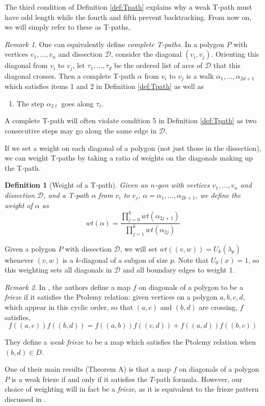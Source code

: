 \documentclass[12pt]{article}
\newtheorem{definition}{Definition}
\theoremstyle{remark}
\newtheorem{remark}{Remark}
\newcommand*{\D}{\mathcal{D}}
\begin{document}
The third condition of Definition \ref{def:Tpath} explains why a weak T-path must have odd length while the fourth and fifth prevent backtracking. From now on, we will simply refer to these as T-paths,

\begin{remark}\label{rem:completeTpath}
One can equivalently define \emph{complete T-paths}. In a polygon $P$ with vertices $v_1,\ldots,v_n$ and dissection $\D$, consider the diagonal $(v_i,v_j)$. Orienting this diagonal from $v_i$ to $v_j$, let $\tau_1,\ldots,\tau_d$ be the ordered list of arcs of $\D$ that this diagonal crosses. Then a complete T-path $\alpha$ from $v_i$ to $v_j$ is a walk $\alpha_1,\ldots,\alpha_{2d+1}$ which satisfies items 1 and 2 in Definition \ref{def:Tpath} as well as 
\begin{enumerate}
    \item[3'] The step $\alpha_{2\ell}$ goes along $\tau_\ell$.
\end{enumerate}

A complete T-path will often violate condition 5 in Definition \ref{def:Tpath} as two consecutive steps may go along the same edge in $\D$. 
\end{remark}

If we set a weight on each diagonal of a polygon (not just those in the dissection), we can weight T-paths by taking a ratio of weights on the diagonals making up the T-path. 

\begin{definition}[Weight of a T-path]
Given an $n$-gon with vertices $v_1,\ldots,v_n$ and dissection $\D$, and a T-path $\alpha$ from $v_i$ to $v_j$, $\alpha = \alpha_1,\ldots,\alpha_{2k+1}$, we define the weight of $\alpha$ as \[
wt(\alpha) = \frac{\displaystyle\prod_{j = 0}^k wt(\alpha_{2j+1})}{\displaystyle\prod_{j=1}^k wt(\alpha_{2j})}
\]
\end{definition}

Given a polygon $P$ with dissection $\D$, we will set $wt((v,w)) = U_k(\lambda_p)$ whenever $(v,w)$ is a $k$-diagonal of a subgon of size $p$. Note that $U_0(x) = 1$, so this weighting sets all diagonals in $\D$ and all boundary edges to weight 1. 

\begin{remark}
In \cite{8}, the authors define a map $f$ on diagonals of a polygon to be a \emph{frieze} if it satisfies the Ptolemy relation: given vertices on a polygon $a,b,c,d,$  which appear in this cyclic order, so that $(a,c)$ and $(b,d)$ are crossing, $f$ satisfies, \[
f((a,c))f((b,d)) = f((a,b))f((c,d)) + f((a,d))f((b,c))
\]

They define a \emph{weak frieze} to be a map which satisfies the Ptolemy relation when $(b,d) \in D$. 

One of their main results (Theorem A) is that a map $f$ on diagonals of a polygon $P$ is a weak frieze if and only if it satisfies the $T$-path formula. However, our choice of weighting will in fact be a \emph{frieze}, as it is equivalent to the frieze pattern discussed in \cite{14}.
\end{remark}
\end{document}
